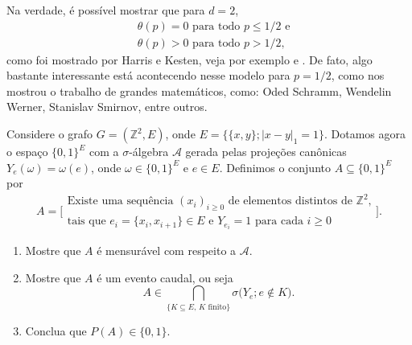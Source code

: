 \begin{topics}
Na verdade, é possível mostrar que para $d = 2$,
\begin{equation}
  \begin{split}
    & \text{$\theta(p) = 0$ para todo $p \leq 1/2$ e}\\
    & \text{$\theta(p) > 0$ para todo $p > 1/2$,}
  \end{split}
\end{equation}
como foi mostrado por Harris e Kesten, veja por exemplo \cite{Gri99} e \cite{bollobas2006percolation}.
De fato, algo bastante interessante está acontecendo nesse modelo para $p = 1/2$, como nos mostrou o trabalho de grandes matemáticos, como: Oded Schramm, Wendelin Werner, Stanislav Smirnov, entre outros.

\begin{exercise}
  Considere o grafo $G = (\mathbb{Z}^2, E)$, onde $E = \big\{ \{x,y\}; |x - y|_1 = 1 \big\}$.
  Dotamos agora o espaço $\{0,1\}^E$ com a $\sigma$-álgebra $\mathcal{A}$ gerada pelas projeções canônicas $Y_e(\omega) = \omega(e)$, onde $\omega \in \{0,1\}^E$ e $e \in E$.
  Definimos o conjunto $A \subseteq \{0,1\}^E$ por
  \begin{equation}
    A = \Big[
    \begin{array}{c}
      \text{Existe uma sequência $(x_i)_{i\ge 0}$  de elementos distintos de $\mathbb{Z}^2$,}\\
      \text{tais que $e_i = \{x_i, x_{i+1}\} \in E$ e $Y_{e_i} = 1$ para cada $i \geq 0$}
    \end{array}
    \Big].
  \end{equation}
  \begin{enumerate}[\quad a)]
  \item Mostre que $A$ é mensurável com respeito a $\mathcal{A}$.
  \item Mostre que $A$ é um evento caudal, ou seja
    \begin{equation}
      A \in \bigcap_{\{K \subseteq E,\, K \text{ finito}\}} \sigma\big( Y_e; e \not \in K \big).
    \end{equation}
  \item Conclua que $P(A) \in \{0,1\}$.
  \end{enumerate}
\end{exercise}




\end{topics}

